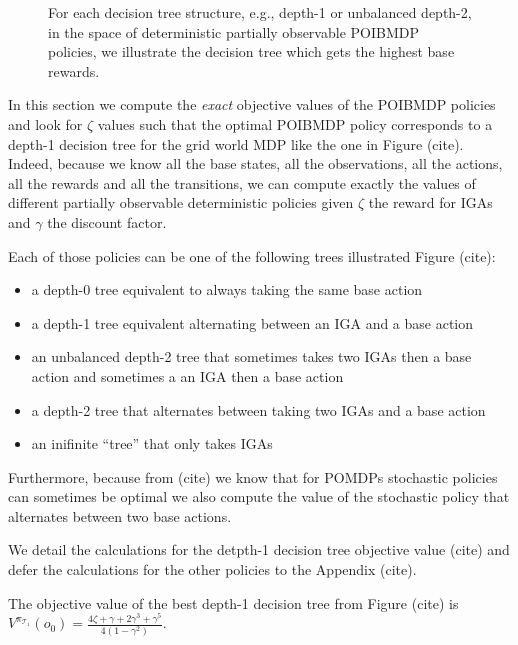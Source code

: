 \begin{figure}[htbp]
    \caption{For each decision tree structure, e.g., depth-1 or unbalanced depth-2, in the space of deterministic partially observable POIBMDP policies, we illustrate the decision tree which gets the highest base rewards.}
    \label{fig:optimal-policy-trees}
\end{figure}

In this section we compute the \textit{exact} objective values of the POIBMDP policies and look for $\zeta$ values such that the optimal POIBMDP policy corresponds to a depth-1 decision tree for the grid world MDP like the one in Figure (cite).  
Indeed, because we know all the base states, all the observations, all the actions, all the rewards and all the transitions, we can compute exactly the values of different partially observable deterministic policies given $\zeta$ the reward for IGAs and $\gamma$ the discount factor.

Each of those policies can be one of the following trees illustrated Figure (cite): 
\begin{itemize}
    \item a depth-0 tree equivalent to always taking the same base action 
    \item a depth-1 tree equivalent alternating between an IGA and a base action 
    \item an unbalanced depth-2 tree that sometimes takes two IGAs then a base action and sometimes a an IGA then a base action
    \item a depth-2 tree that alternates between taking two IGAs and a base action
    \item an inifinite ``tree'' that only takes IGAs
\end{itemize}
Furthermore, because from (cite) we know that for POMDPs stochastic policies can sometimes be optimal we also compute the value of the stochastic policy that alternates between two base actions.

We detail the calculations for the detpth-1 decision tree objective value (cite) and defer the calculations for the other policies to the Appendix (cite).

\begin{proposition} The objective value of the best depth-1 decision tree from Figure (cite) is $V^{\pi_{\mathcal{T}_1}}(o_0) = \frac{4\zeta + \gamma + 2\gamma^3 + \gamma^5}{4(1-\gamma^2)}$.
\end{proposition}

